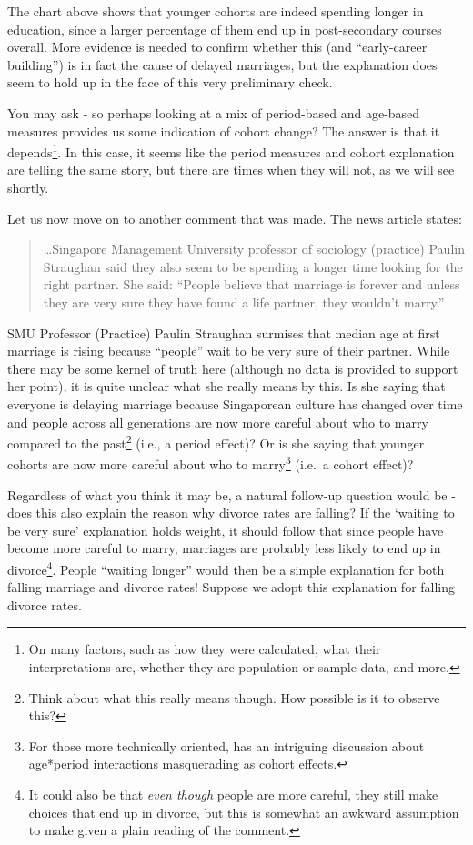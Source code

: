 \documentclass[openany]{book}
\let\rmarkdownfootnote\footnote%
\def\footnote{\protect\rmarkdownfootnote}
\begin{document}
The chart above shows that younger cohorts are indeed spending longer in
education, since a larger percentage of them end up in post-secondary
courses overall. More evidence is needed to confirm whether this (and
``early-career building'') is in fact the cause of delayed marriages,
but the explanation does seem to hold up in the face of this very
preliminary check.

You may ask - so perhaps looking at a mix of period-based and age-based
measures provides us some indication of cohort change? The answer is
that it depends\footnote{On many factors, such as how they were
  calculated, what their interpretations are, whether they are
  population or sample data, and more.}. In this case, it seems like the
period measures and cohort explanation are telling the same story, but
there are times when they will not, as we will see shortly.

Let us now move on to another comment that was made. The news article
states:

\begin{quote}
\ldots{}Singapore Management University professor of sociology
(practice) Paulin Straughan said they also seem to be spending a longer
time looking for the right partner. She said: ``People believe that
marriage is forever and unless they are very sure they have found a life
partner, they wouldn't marry.''
\end{quote}

SMU Professor (Practice) Paulin Straughan surmises that median age at
first marriage is rising because ``people'' wait to be very sure of
their partner. While there may be some kernel of truth here (although no
data is provided to support her point), it is quite unclear what she
really means by this. Is she saying that everyone is delaying marriage
because Singaporean culture has changed over time and people across all
generations are now more careful about who to marry compared to the
past\footnote{Think about what this really means though. How possible is
  it to observe this?} (i.e., a period effect)? Or is she saying that
younger cohorts are now more careful about who to marry\footnote{For
  those more technically oriented, \citet{martin_comment:_2009} has an
  intriguing discussion about age*period interactions masquerading as
  cohort effects.} (i.e.~a cohort effect)?

Regardless of what you think it may be, a natural follow-up question
would be - does this also explain the reason why divorce rates are
falling? If the `waiting to be very sure' explanation holds weight, it
should follow that since people have become more careful to marry,
marriages are probably less likely to end up in divorce\footnote{It
  could also be that \emph{even though} people are more careful, they
  still make choices that end up in divorce, but this is somewhat an
  awkward assumption to make given a plain reading of the comment.}.
People ``waiting longer'' would then be a simple explanation for both
falling marriage and divorce rates! Suppose we adopt this explanation
for falling divorce rates.
\end{document}
